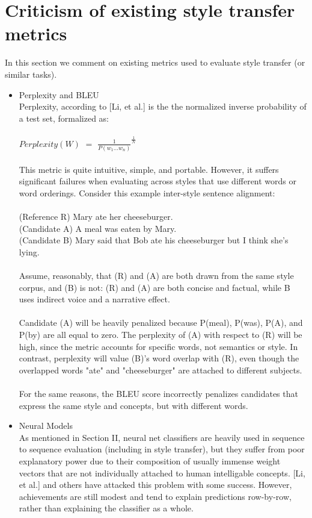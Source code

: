 \documentclass[letterpaper, 10 pt, conference]{ieeeconf}  %
\begin{document}
\section{Criticism of existing style transfer metrics}
In this section we comment on existing metrics used to evaluate style transfer (or similar tasks).
\\
\begin{itemize}
  \item{ Perplexity and BLEU}
  \\
  Perplexity, according to [Li, et al.] is the the normalized inverse probability of a test set, formalized as:
  \\
  \\
  $Perplexity(W) $ $=$ $\frac{1}{P(w_1 \ldots w_n)}^{\frac{1}{N}}$
  \\
  \\
  This metric is quite intuitive, simple, and portable. However, it suffers significant failures when evaluating across styles that use different words or word orderings. Consider this example inter-style sentence alignment:\\
  \\
  (Reference R) Mary ate her cheeseburger.\\
  (Candidate A) A meal was eaten by Mary.\\
  (Candidate B) Mary said that Bob ate his cheeseburger but I think she's lying.\\
  \\
  Assume, reasonably, that (R) and (A) are both drawn from the same style corpus, and (B) is not: (R) and (A) are both concise and factual, while B uses indirect voice and a narrative effect.
  \\
  \\
  Candidate (A) will be heavily penalized because P(meal), P(was), P(A), and P(by) are all equal to zero.  The perplexity of (A) with respect to (R) will be high, since the metric accounts for specific words, not semantics or style. In contrast, perplexity will value (B)'s word overlap with (R), even though the overlapped words "ate" and "cheeseburger" are attached to different subjects.
  \\
  \\
  For the same reasons, the BLEU score incorrectly penalizes candidates that express the same style and concepts, but with different words. \\

  \item{Neural Models}\\ As mentioned in Section II, neural net classifiers are heavily used in sequence to sequence evaluation (including in style transfer), but they suffer from poor explanatory power due to their composition of usually immense weight vectors that are not individually attached to human intelligable concepts. [Li, et al.] and others have attacked this problem with some success. However, achievements are still modest and tend to explain predictions row-by-row, rather than explaining the classifier as a whole. \\


\end{itemize}
\end{document}
